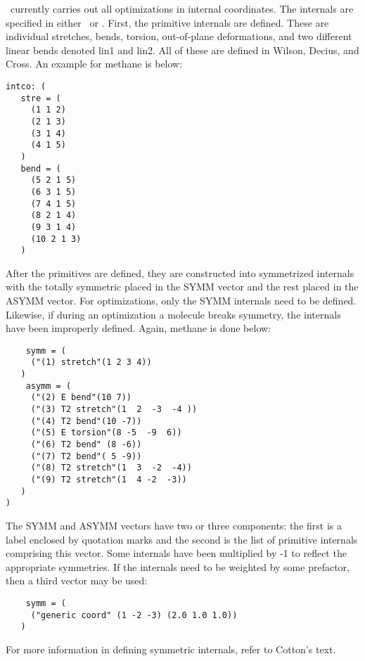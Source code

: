 \PSIthree\ currently carries out all optimizations in internal
coordinates. The internals are specified in either \ or
\intcodat. First, the primitive internals are defined. These are
individual stretches, bends, torsion, out-of-plane deformations, and
two different linear bends denoted lin1 and lin2.  All of these are
defined in Wilson, Decius, and Cross. An example for methane is below:
\begin{verbatim}
intco: (
   stre = (
     (1 1 2)
     (2 1 3)
     (3 1 4)
     (4 1 5)
   )
   bend = (
     (5 2 1 5)
     (6 3 1 5)
     (7 4 1 5)
     (8 2 1 4)
     (9 3 1 4)
     (10 2 1 3)
   )
\end{verbatim}
After the primitives are defined, they are constructed into
symmetrized internals with the totally symmetric placed in
the SYMM vector and the rest placed in the ASYMM vector. For
optimizations, only the SYMM internals need to be defined.
Likewise, if during an optimization a molecule breaks symmetry,
the internals have been improperly defined. Again, methane is done
below:
\begin{verbatim}
    symm = (
     ("(1) stretch"(1 2 3 4))
   )
    asymm = (
     ("(2) E bend"(10 7))
     ("(3) T2 stretch"(1  2  -3  -4 ))
     ("(4) T2 bend"(10 -7))
     ("(5) E torsion"(8 -5  -9  6))
     ("(6) T2 bend" (8 -6))
     ("(7) T2 bend"( 5 -9))
     ("(8) T2 stretch"(1  3  -2  -4))
     ("(9) T2 stretch"(1  4 -2  -3))
   )
)
\end{verbatim}
The SYMM and ASYMM vectors have two or three components: the first
is a label enclosed by quotation marks and the second is the list
of primitive internals comprising this vector. Some
internals have been multiplied by -1 to reflect the appropriate
symmetries. If the internals need to be weighted by some prefactor,
then a third vector may be used: 
\begin{verbatim}
    symm = (
     ("generic coord" (1 -2 -3) (2.0 1.0 1.0))
   )
\end{verbatim}
For more information in defining symmetric internals, refer to Cotton's text.

